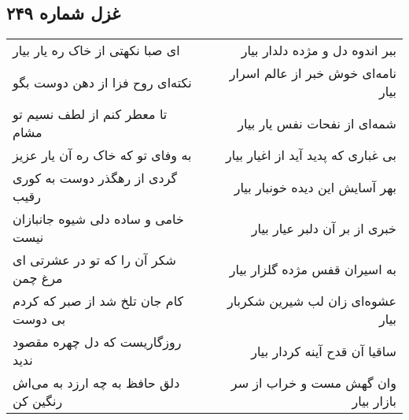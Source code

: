 \begin{center}
\section*{غزل شماره ۲۴۹}
\label{sec:sh249}
\begin{longtable}{l p{0.5cm} r}
ای صبا نکهتی از خاک ره یار بیار
&&
ببر اندوه دل و مژده دلدار بیار
\\
نکته‌ای روح فزا از دهن دوست بگو
&&
نامه‌ای خوش خبر از عالم اسرار بیار
\\
تا معطر کنم از لطف نسیم تو مشام
&&
شمه‌ای از نفحات نفس یار بیار
\\
به وفای تو که خاک ره آن یار عزیز
&&
بی غباری که پدید آید از اغیار بیار
\\
گردی از رهگذر دوست به کوری رقیب
&&
بهر آسایش این دیده خونبار بیار
\\
خامی و ساده دلی شیوه جانبازان نیست
&&
خبری از بر آن دلبر عیار بیار
\\
شکر آن را که تو در عشرتی ای مرغ چمن
&&
به اسیران قفس مژده گلزار بیار
\\
کام جان تلخ شد از صبر که کردم بی دوست
&&
عشوه‌ای زان لب شیرین شکربار بیار
\\
روزگاریست که دل چهره مقصود ندید
&&
ساقیا آن قدح آینه کردار بیار
\\
دلق حافظ به چه ارزد به می‌اش رنگین کن
&&
وان گهش مست و خراب از سر بازار بیار
\\
\end{longtable}
\end{center}

